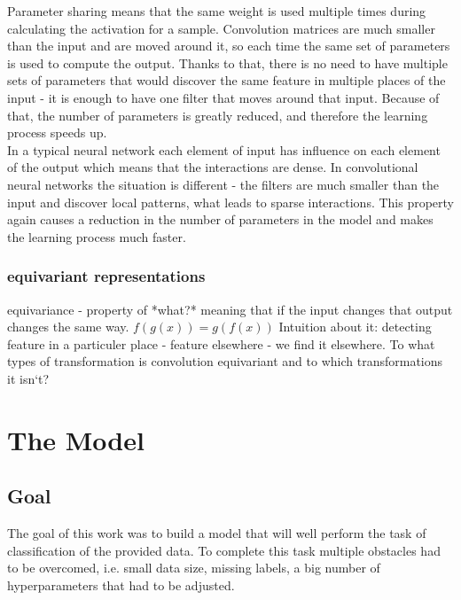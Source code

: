 \documentclass[a4paper,10pt]{report}
\begin{document}
	  Parameter sharing means that the same weight is used multiple times during calculating the activation for a sample.
	  Convolution matrices are much smaller than the input and are moved around it, so each time the same set of parameters is used to compute the output. Thanks to that, there is no need to have multiple sets of parameters that would discover the same feature in multiple places of the input - it is enough to have one filter that moves around that input. Because of that, the number of parameters is greatly reduced, and therefore the learning process speeds up.\\
	  
	  In a typical neural network each element of input has influence on each element of the output which means that the interactions are dense. In convolutional neural networks the situation is different - the filters are much smaller than the input and discover local patterns, what leads to sparse interactions. This property again causes a reduction in the number of parameters in the model and makes the learning process much faster.\\	
	  
	\subsection{equivariant representations} %
	  equivariance - property of *what?* meaning that if the input changes that output changes the same way. $f(g(x)) = g(f(x))$ Intuition about it: detecting feature in a particuler place - feature elsewhere - we find it elsewhere. To what types of transformation is convolution equivariant and to which transformations it isn`t?\\
	
	
  \chapter{The Model}
      
      \section{Goal}
      The goal of this work was to build a model that will well perform the task of classification of the provided data. To complete this task multiple obstacles had to be overcomed, i.e. small data size, missing labels, a big number of hyperparameters that had to be adjusted.\\
     
\end{document}
